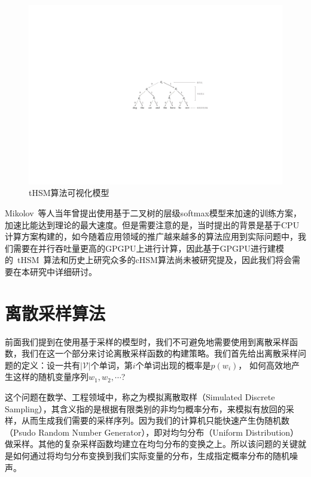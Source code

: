 \begin{figure}[!t]
  \centering
\includegraphics[width=.85\linewidth]{./figures/thsm-example.pdf}
\caption{tHSM算法可视化模型}\label{fig:case_thsm}
\end{figure}

Mikolov~等人当年曾提出使用基于二叉树的层级softmax模型来加速的训练方案，加速比能达到理论的最大速度。但是需要注意的是，当时提出的背景是基于CPU计算方案构建的，如今随着应用领域的推广越来越多的算法应用到实际问题中，我们需要在并行吞吐量更高的GPGPU上进行计算，因此基于GPGPU进行建模的~tHSM~算法和历史上研究众多的cHSM算法尚未被研究提及，因此我们将会需要在本研究中详细研讨。

\section{离散采样算法}
前面我们提到在使用基于采样的模型时，我们不可避免地需要使用到离散采样函数，我们在这一个部分来讨论离散采样函数的构建策略。我们首先给出离散采样问题的定义：设一共有$|\mathcal{V}|$个单词，第$i$个单词出现的概率是$p(w_i)$， 如何高效地产生这样的随机变量序列$w_1,w_2,\cdots$?

这个问题在数学、工程领域中，称之为模拟离散取样（Simulated Discrete Sampling），其含义指的是根据有限类别的非均匀概率分布，来模拟有放回的采样，从而生成我们需要的采样序列。因为我们的计算机只能快速产生伪随机数（Psudo Random Number Generator），即对均匀分布（Uniform Distribution）做采样。其他的复杂采样函数均建立在均匀分布的变换之上。所以该问题的关键就是如何通过将均匀分布变换到我们实际变量的分布，生成指定概率分布的随机噪声。

